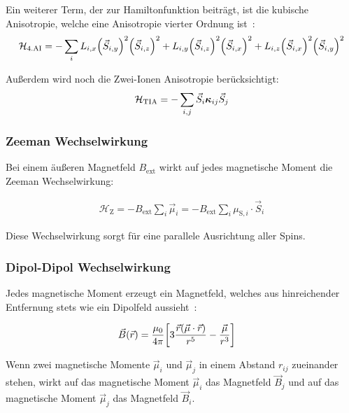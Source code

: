 \documentclass[main.tex]{subfiles}
\begin{document}
Ein weiterer Term, der zur Hamiltonfunktion beiträgt, ist die kubische Anisotropie, welche eine Anisotropie vierter Ordnung ist~\cite{GrossMarx}:
\begin{align}
	\mathcal{H}_{\text{4.AI}} = -\sum_{i} L_{i,x} \qty(\vec{S}_{i,y})^2 \qty(\vec{S}_{i,z})^2 
	+ L_{i,y} \qty(\vec{S}_{i,z})^2 \qty(\vec{S}_{i,x})^2 
	+ L_{i,z} \qty(\vec{S}_{i,x})^2 \qty(\vec{S}_{i,y})^2\label{eq:hamilton-4a}
\end{align}

Außerdem wird noch die Zwei-Ionen Anisotropie berücksichtigt:
\begin{align}
	\mathcal{H}_{\text{TIA}} = -\sum_{i,j} \vec{S}_i \bm{\mathrm{\kappa}}_{ij} \vec{S}_j\label{eq:hamilton-tia}
\end{align}
\subsubsection*{Zeeman Wechselwirkung}
Bei einem äußeren Magnetfeld \(B_\text{ext}\) wirkt auf jedes magnetische Moment die Zeeman Wechselwirkung:

\begin{align}
	\mathcal{H}_{\text{Z}} = - B_\text{ext} \sum_{i} \vec{\mu}_i = 
	- B_\text{ext} \sum_{i} \mu_{\text{S},i} \cdot \vec{S}_i\label{eq:hamilton-zeeman}
\end{align}

Diese Wechselwirkung sorgt für eine parallele Ausrichtung aller Spins.

\subsubsection*{Dipol-Dipol Wechselwirkung}

Jedes magnetische Moment erzeugt ein Magnetfeld, welches aus hinreichender Entfernung stets wie ein Dipolfeld aussieht~\cite{Nolting-3-elektrodynamik}:

\begin{align}
	\vec{B}(\vec{r}) & = \frac{\mu_0}{4\pi} \qty[3 \frac{\vec{r}(\vec{\mu} \cdot
			\vec{r})}{r^5} - \frac{\vec{\mu}}{r^3}]\label{eq:dipolmoment}
\end{align}

Wenn zwei magnetische Momente \(\vec{\mu}_i\) und \(\vec{\mu}_j\) in einem Abstand \(r_{ij}\) zueinander stehen, wirkt auf das magnetische Moment \(\vec{\mu}_i\) das Magnetfeld \(\vec{B}_j\) und auf das magnetische Moment \(\vec{\mu}_j\) das Magnetfeld \(\vec{B}_i\).
\end{document}
